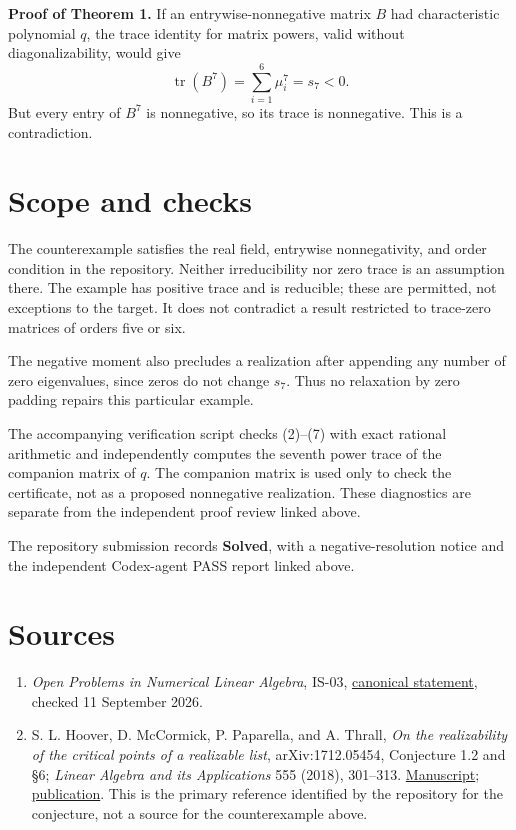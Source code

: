 \documentclass[10pt,a4paper]{article}
\providecommand{\tightlist}{\setlength{\itemsep}{0pt}\setlength{\parskip}{0pt}}
\begin{document}
\textbf{Proof of Theorem 1.} If an entrywise-nonnegative matrix \(B\)
had characteristic polynomial \(q\), the trace identity for matrix
powers, valid without diagonalizability, would give \[
 \operatorname{tr}(B^7)=\sum_{i=1}^6\mu_i^7=s_7<0.
\] But every entry of \(B^7\) is nonnegative, so its trace is
nonnegative. This is a contradiction.

\section{Scope and checks}\label{scope-and-checks}

The counterexample satisfies the real field, entrywise nonnegativity,
and order condition in the repository. Neither irreducibility nor zero
trace is an assumption there. The example has positive trace and is
reducible; these are permitted, not exceptions to the target. It does
not contradict a result restricted to trace-zero matrices of orders five
or six.

The negative moment also precludes a realization after appending any
number of zero eigenvalues, since zeros do not change \(s_7\). Thus no
relaxation by zero padding repairs this particular example.

The accompanying verification script checks (2)--(7) with exact rational
arithmetic and independently computes the seventh power trace of the
companion matrix of \(q\). The companion matrix is used only to check
the certificate, not as a proposed nonnegative realization. These
diagnostics are separate from the independent proof review linked above.

The repository submission records \textbf{Solved}, with a
negative-resolution notice and the independent Codex-agent PASS report
linked above.

\section{Sources}\label{sources}

\begin{enumerate}
\def\labelenumi{\arabic{enumi}.}
\tightlist
\item
  \emph{Open Problems in Numerical Linear Algebra}, IS-03,
  \href{https://github.com/ajt60gaibb/OpenProblemsInNLA/blob/main/eigenvalues-and-inverse-problems/IS-03/README.md}{canonical
  statement}, checked 11 September 2026.
\item
  S. L. Hoover, D. McCormick, P. Paparella, and A. Thrall, \emph{On the
  realizability of the critical points of a realizable list},
  arXiv:1712.05454, Conjecture 1.2 and §6; \emph{Linear Algebra and its
  Applications} 555 (2018), 301--313.
  \href{https://arxiv.org/abs/1712.05454}{Manuscript};
  \href{https://doi.org/10.1016/j.laa.2018.06.024}{publication}. This is
  the primary reference identified by the repository for the conjecture,
  not a source for the counterexample above.
\end{enumerate}
\end{document}
